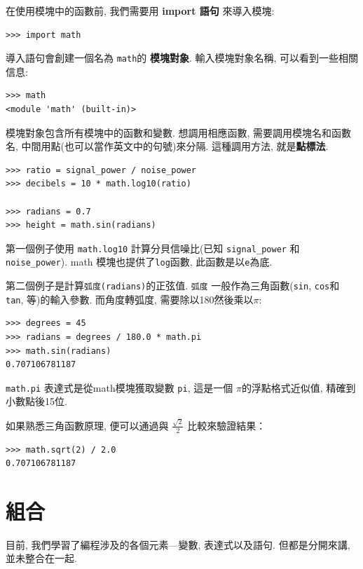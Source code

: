 \documentclass[10pt]{book}
\begin{document}
在使用模塊中的函數前, 我們需要用 {\bf import 語句} 來導入模塊:

\begin{verbatim}
>>> import math
\end{verbatim}
%
導入語句會創建一個名為 {\tt math}的 {\bf 模塊對象}. 
輸入模塊對象名稱, 可以看到一些相關信息:

\begin{verbatim}
>>> math
<module 'math' (built-in)>
\end{verbatim}
%
模塊對象包含所有模塊中的函數和變數. 想調用相應函數, 需要調用模塊名和函數名, 
中間用點(也可以當作英文中的句號)來分隔. 這種調用方法, 就是{\bf 點標法}. 

\begin{verbatim}
>>> ratio = signal_power / noise_power
>>> decibels = 10 * math.log10(ratio)

>>> radians = 0.7
>>> height = math.sin(radians)
\end{verbatim}
%
第一個例子使用 \verb"math.log10" 計算分貝信噪比(已知 \verb"signal_power" 和
\verb"noise_power"). 
math 模塊也提供了{\tt log}函數, 此函數是以{\tt e}為底. 

第二個例子是計算{\tt 弧度(radians)}的正弦值. 
{\tt 弧度} 一般作為三角函數({\tt sin}, {\tt cos}和 {\tt tan}, 等)的輸入參數. 
而角度轉弧度, 需要除以180然後乘以$\pi$:

\begin{verbatim}
>>> degrees = 45
>>> radians = degrees / 180.0 * math.pi
>>> math.sin(radians)
0.707106781187
\end{verbatim}
%
{\tt math.pi} 表達式是從math模塊獲取變數 {\tt pi}, 這是一個 $\pi$的浮點格式近似值, 
精確到小數點後15位. 

如果熟悉三角函數原理, 便可以通過與 $\frac{ \sqrt{2}} {2}$ 比較來驗證結果：

\begin{verbatim}
>>> math.sqrt(2) / 2.0
0.707106781187
\end{verbatim}
%

\section{組合}

目前, 我們學習了編程涉及的各個元素---變數, 表達式以及語句. 
但都是分開來講, 並未整合在一起. 
\end{document}
